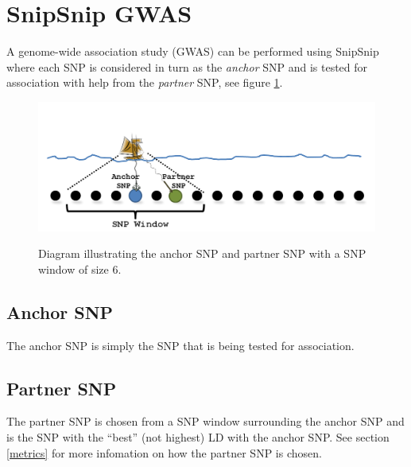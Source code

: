 \documentclass[a4paper,12pt]{article}
\begin{document}



\section{SnipSnip GWAS}
\label{snipsnip-gwas}

A genome-wide association study (GWAS) can be performed using SnipSnip where each SNP is considered in turn as the {\it anchor} SNP and is tested for association with help from the {\it partner} SNP, see figure  \ref{anchor}. 
{\begin{figure}[ht]
{\begin{center}
{\includegraphics[width=400pt]{anchor.png}}
\caption{Diagram illustrating the anchor SNP and partner SNP with a SNP window of size 6.}
\label{anchor}
\end{center}}
\end{figure}
}
\subsection{Anchor SNP}
\label{anchor-snp}

The anchor SNP is simply the SNP that is being tested for association. 


\subsection{Partner SNP}
\label{partner-snp}

The partner SNP is chosen from a SNP window surrounding the anchor SNP and is the SNP with the ``best'' (not highest) LD with the anchor SNP. See  section \ref{metrics} for more infomation on how the partner SNP is chosen. 

\end{document}

